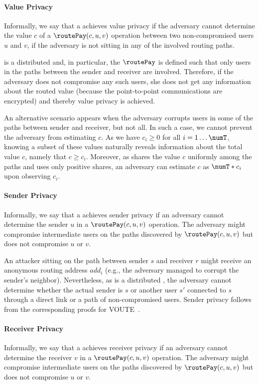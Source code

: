 \paragraph*{Value Privacy} Informally, we say that a \paysys achieves value privacy if 
the adversary cannot determine the value $c$ of a $\routePay(c,u,v)$ operation between 
two non-compromised users $u$ and $v$, if the adversary is not sitting in any of the 
involved routing paths. 

\oursys is a distributed \paysys and, in particular, the $\routePay$ is defined 
such that only users in the paths  
between the sender and receiver are involved. Therefore, if the adversary does not 
compromise any such users, she does not get any information about the 
routed value (because the point-to-point communications are encrypted) and thereby value privacy is achieved.   

An alternative scenario appears when the adversary corrupts users 
in some of the paths between sender and receiver, but not all. 
In such a case, we cannot prevent the adversary from estimating $c$. As we have $c_i\geq 0$ for all $i=1\ldots \numT$, knowing a subset of these values naturally reveals information about the total value $c$, namely that $c \geq c_i$. Moreover, as  \oursys shares the value $c$ uniformly among the paths and uses 
only positive shares, an adversary can estimate $c$ as $\numT * c_i$ upon observing $c_i$. 

\paragraph*{Sender Privacy} Informally, we say that a \paysys achieves sender privacy if an adversary 
cannot determine the sender $u$ in a $\routePay(c,u,v)$ operation. The adversary might compromise intermediate users
on the paths discovered by $\routePay(c,u,v)$ but does not compromise $u$ or $v$.   

An attacker sitting on the path between sender $s$ and receiver $r$ might receive an anonymous 
routing address $add_i$ (e.g., the adversary managed to corrupt the sender's neighbor). 
Nevertheless, as \oursys is a distributed \paysys, 
the adversary cannot determine whether the actual sender is $s$ or 
another user $s'$ connected to $s$ through a direct link or a path of non-compromised users.
Sender privacy follows from the corresponding proofs for VOUTE~\cite{roos16voute}. 

\paragraph*{Receiver Privacy} Informally, we say that a \paysys achieves receiver privacy if an adversary 
cannot determine the receiver $v$ in a $\routePay(c,u,v)$ operation. The adversary might compromise intermediate users
on the paths discovered by $\routePay(c,u,v)$ but does not compromise $u$ or $v$.   

